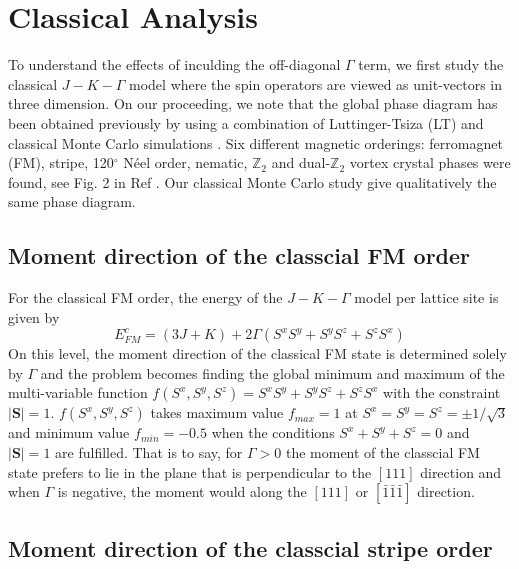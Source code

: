 \documentclass[aps,prb,reprint,groupedaddress,showpacs,amsfonts,amsmath,amssymb,superscriptaddress]{revtex4-1}
\begin{document}
\section{Classical Analysis}
To understand the effects of inculding the off-diagonal $\Gamma$ term, we first study the classical $J-K-\Gamma$ model where the spin operators are viewed as unit-vectors in three dimension. On our proceeding, we note that the global phase diagram has been obtained previously by using a combination of Luttinger-Tsiza (LT) and classical Monte Carlo simulations \cite{PhysRevB.92.165108}. Six different magnetic orderings: ferromagnet (FM), stripe, 120$^\circ$ N\'{e}el order, nematic, $\mathbb{Z}_2$ and dual-$\mathbb{Z}_2$ vortex crystal phases were found, see Fig. 2 in Ref . Our classical Monte Carlo study give qualitatively the same phase diagram.

\subsection{Moment direction of the classcial FM order}
For the classical FM order, the energy of the $J-K-\Gamma$ model per lattice site is given by
\begin{equation}
    E_{FM}^{c} = (3J + K) + 2\Gamma(S^xS^y + S^yS^z + S^zS^x)
    \label{eq:EcFM}
\end{equation}
On this level, the moment direction of the classical FM state is determined solely by $\Gamma$ and the problem becomes finding the global minimum and maximum of the multi-variable function $f(S^x, S^y, S^z) = S^xS^y + S^yS^z + S^zS^x$ with the constraint $|\mathbf{S}| = 1$. $f(S^x, S^y, S^z)$ takes maximum value $f_{max}=1$ at $S^x=S^y=S^z=\pm 1/\sqrt{3}$ and minimum value $f_{min}=-0.5$ when the conditions $S^x + S^y + S^z = 0$ and $|\mathbf{S}| = 1$ are fulfilled. That is to say, for $\Gamma > 0$ the moment of the classcial FM state prefers to lie in the plane that is perpendicular to the $[111]$ direction and when $\Gamma$ is negative, the moment would along the $[111]$ or $[\bar{1}\bar{1}\bar{1}]$ direction.

\subsection{Moment direction of the classcial stripe order}
\end{document}
